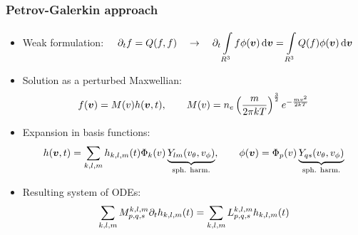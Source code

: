 \documentclass[mathserif, aspectratio=169]{beamer}
\newcommand{\ud}{\,\mathrm{d}}
\newcommand{\vect}[1]{\boldsymbol{#1}}
\newcommand{\of}[1]{\mleft( #1 \mright)}
\newcommand{\vth}{v_{\textrm{th}}}
\newcommand{\myint}[2]{\int\limits_{#1}^{#2}}
\begin{document}
\begin{frame}
\frametitle{Petrov-Galerkin approach}
%
\small
\begin{itemize}

\item Weak formulation:
$
\displaystyle
\quad
\partial_t f = Q(f,f)
\quad \rightarrow \quad
\partial_t \myint{R^3}{} f \phi\of{\vect{v}} \ud \vect{v} =
\myint{R^3}{} Q(f) \phi\of{\vect{v}} \ud \vect{v}
$

\item Solution as a perturbed Maxwellian:
\begin{align*}
f\of{\vect{v}} = M\of{v} h\of{\vect{v},t}
, \quad\quad
M\of{v} = n_e \left( \frac{m}{2 \pi kT }\right)^{\frac32} e^{-\frac{mv^2}{2kT}}
\end{align*}

\item Expansion in basis functions:
\begin{align*}
h\of{\vect{v},t} =
\sum_{k,l,m} h_{k,l,m} \of{t} \Phi_k\of{v} \underbrace{Y_{lm}\of{v_\theta, v_\phi}}_{\tiny\text{sph. harm.}},
\quad
\quad
\phi\of{\vect{v}} = \Phi_p\of{v} \underbrace{Y_{qs}\of{v_\theta, v_\phi}}_{\tiny\text{sph. harm.}}
\end{align*}

\item Resulting system of ODEs:
\begin{align*}
\sum_{k,l,m} M_{p,q,s}^{k,l,m} \partial_t h_{k,l,m}\of{t} = \sum_{k,l,m}  L_{p,q,s}^{k,l,m} h_{k,l,m}\of{t}
\end{align*}
\end{itemize}
%
\end{frame}
\end{document}
